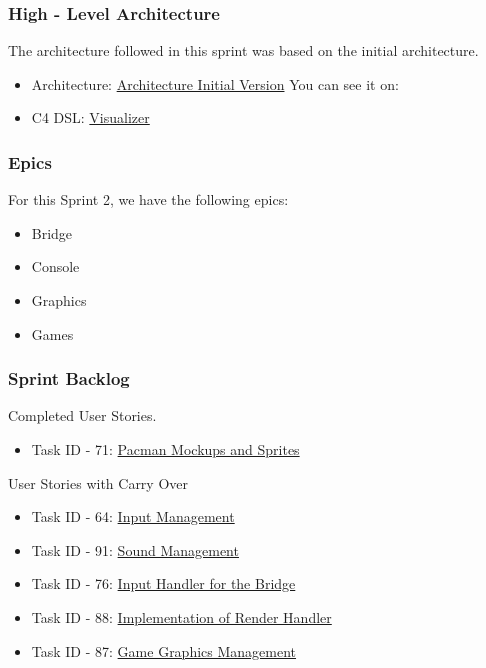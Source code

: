 \subsubsection{High - Level Architecture}

The architecture followed in this sprint was based on the initial architecture.

\begin{itemize}
    \item Architecture: \href{https://github.com/Pending-Name-21/arquitecture/pull/1/files}{Architecture Initial Version}
    You can see it on: 
    \item C4 DSL: \href{https://structurizr.com/dsl}{Visualizer}
\end{itemize}

\newpage

\subsubsection{Epics}

For this Sprint 2, we have the following epics:

\begin{itemize}
    \item Bridge
    \item Console
    \item Graphics
    \item Games
\end{itemize}

\subsubsection{Sprint Backlog}

Completed User Stories.

\begin{itemize}
    \item Task ID - 71: \href{https://tree.taiga.io/project/joseluis-teran-coffeetime/us/71?milestone=393080}{Pacman Mockups and Sprites}    
\end{itemize}

User Stories with Carry Over

\begin{itemize}
    \item Task ID - 64: \href{https://tree.taiga.io/project/joseluis-teran-coffeetime/us/64?milestone=393697}{Input Management}
    \item Task ID - 91: \href{https://tree.taiga.io/project/joseluis-teran-coffeetime/us/91?milestone=393697}{Sound Management}
    \item Task ID - 76: \href{https://tree.taiga.io/project/joseluis-teran-coffeetime/us/76?milestone=393697}{Input Handler for the Bridge}
    \item Task ID - 88: \href{https://tree.taiga.io/project/joseluis-teran-coffeetime/us/88?milestone=394885}{Implementation of Render Handler}
    \item Task ID - 87: \href{https://tree.taiga.io/project/joseluis-teran-coffeetime/us/87?milestone=394885}{Game Graphics Management}
\end{itemize}

